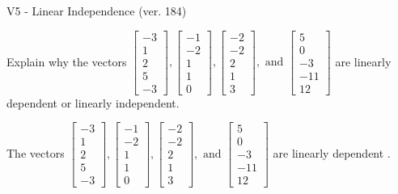 \begin{exercise}
  \begin{exerciseTitle}V5 - Linear Independence (ver. 184)\end{exerciseTitle}
  \begin{exerciseStatement}
    Explain why the vectors \(\left[\begin{array}{r}
-3 \\
1 \\
2 \\
5 \\
-3
\end{array}\right] , \left[\begin{array}{r}
-1 \\
-2 \\
1 \\
1 \\
0
\end{array}\right] , \left[\begin{array}{r}
-2 \\
-2 \\
2 \\
1 \\
3
\end{array}\right] , \text{ and } \left[\begin{array}{r}
5 \\
0 \\
-3 \\
-11 \\
12
\end{array}\right]\) are linearly dependent or linearly independent.	


  \end{exerciseStatement}
  \begin{exerciseAnswer}
   The vectors \(\left[\begin{array}{r}
-3 \\
1 \\
2 \\
5 \\
-3
\end{array}\right] , \left[\begin{array}{r}
-1 \\
-2 \\
1 \\
1 \\
0
\end{array}\right] , \left[\begin{array}{r}
-2 \\
-2 \\
2 \\
1 \\
3
\end{array}\right] , \text{ and } \left[\begin{array}{r}
5 \\
0 \\
-3 \\
-11 \\
12
\end{array}\right]\) are 
  	 linearly dependent  .
  


  \end{exerciseAnswer}
\end{exercise}
